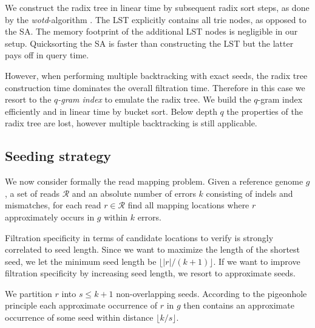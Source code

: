 We construct the radix tree in linear time by subsequent radix sort steps, as done by the \emph{wotd}-algorithm \citep{Giegerich1999}.
The LST explicitly contains all trie nodes, as opposed to the SA.
The memory footprint of the additional LST nodes is negligible in our setup.
Quicksorting the SA is faster than constructing the LST but the latter pays off in query time.


However, when performing multiple backtracking with exact seeds, the radix tree construction time dominates the overall filtration time.
Therefore in this case we resort to the \emph{$q$-gram index} to emulate the radix tree.
We build the $q$-gram index efficiently and in linear time by bucket sort.
Below depth $q$ the properties of the radix tree are lost, however multiple backtracking is still applicable.

\subsection{Seeding strategy}
\label{masai:engineering:seeding}



We now consider formally the read mapping problem.
Given a reference genome $g$, a set of reads $\mathcal{R}$ and an absolute number of errors $k$ consisting of indels and mismatches, for each read $r \in \mathcal{R}$ find all mapping locations where $r$ approximately occurs in $g$ within $k$ errors.

Filtration specificity in terms of candidate locations to verify is strongly correlated to seed length.
Since we want to maximize the length of the shortest seed, we let the minimum seed length be $\lfloor |r|/(k+1) \rfloor$.
If we want to improve filtration specificity by increasing seed length, we resort to approximate seeds.

We partition $r$ into $s \leq k+1$ non-overlapping seeds.
According to the pigeonhole principle each approximate occurrence of $r$ in $g$ then contains an approximate occurrence of some seed within distance $\lfloor k/s \rfloor$.

